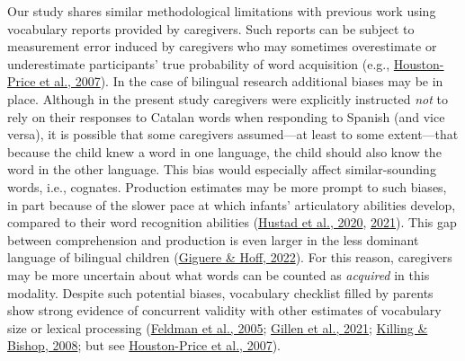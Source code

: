 \documentclass[
]{article}
\begin{document}
Our study shares similar methodological limitations with previous work
using vocabulary reports provided by caregivers. Such reports can be
subject to measurement error induced by caregivers who may sometimes
overestimate or underestimate participants' true probability of word
acquisition (e.g.,
\protect\hyperlink{ref-houston-price2007discrepancy}{Houston-Price et
al., 2007}). In the case of bilingual research additional biases may be
in place. Although in the present study caregivers were explicitly
instructed \emph{not} to rely on their responses to Catalan words when
responding to Spanish (and vice versa), it is possible that some
caregivers assumed---at least to some extent---that because the child
knew a word in one language, the child should also know the word in the
other language. This bias would especially affect similar-sounding
words, i.e., cognates. Production estimates may be more prompt to such
biases, in part because of the slower pace at which infants'
articulatory abilities develop, compared to their word recognition
abilities (\protect\hyperlink{ref-hustad2020development}{Hustad et al.,
2020}, \protect\hyperlink{ref-hustad2021speech}{2021}). This gap between
comprehension and production is even larger in the less dominant
language of bilingual children
(\protect\hyperlink{ref-giguere2022bilingual}{Giguere \& Hoff, 2022}).
For this reason, caregivers may be more uncertain about what words can
be counted as \emph{acquired} in this modality. Despite such potential
biases, vocabulary checklist filled by parents show strong evidence of
concurrent validity with other estimates of vocabulary size or lexical
processing (\protect\hyperlink{ref-feldman2005concurrent}{Feldman et
al., 2005}; \protect\hyperlink{ref-gillen2021tapping}{Gillen et al.,
2021}; \protect\hyperlink{ref-killing2008move}{Killing \& Bishop, 2008};
but see
\protect\hyperlink{ref-houston-price2007discrepancy}{Houston-Price et
al., 2007}).
\end{document}
